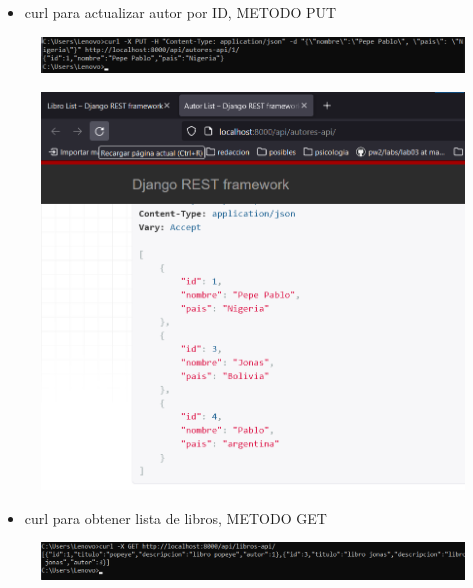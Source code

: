 \documentclass{article}
\begin{document}
	\begin{itemize}
		\item curl para actualizar autor por ID, METODO PUT
	\end{itemize}
	\begin{figure}[H]
		\centering
		\includegraphics[width=1\textwidth,keepaspectratio]{pruebas/curlActualizarAutor.png}
	\end{figure}
	\begin{figure}[H]
		\centering
		\includegraphics[width=1\textwidth,keepaspectratio]{pruebas/tarea-autores-actualizado2.png}
	\end{figure}
	
	\begin{itemize}
		\item curl para obtener lista de libros, METODO GET
	\end{itemize}
	\begin{figure}[H]
		\centering
		\includegraphics[width=1\textwidth,keepaspectratio]{pruebas/curlObtenerLibro.png}
	\end{figure}
	\clearpage	
	
\end{document}
